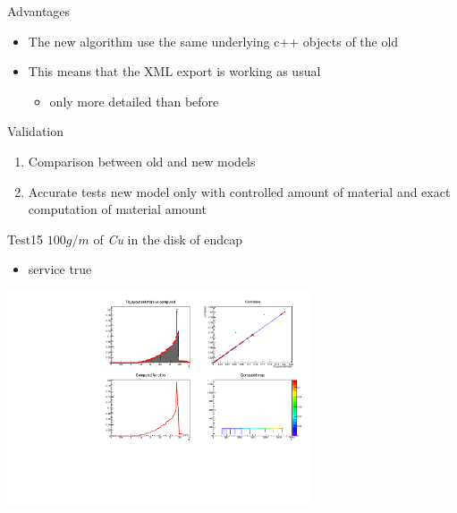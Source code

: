 \documentclass[pdftex, 11pt]{beamer}
\begin{document}
\begin{frame}{Advantages}
  \begin{itemize}
  \item The new algorithm use the \alert{same} underlying c++ objects of the old
  \item This means that the \alert{XML} export is working as usual
    \begin{itemize}
    \item only more \alert{detailed} than before
    \end{itemize}
  \end{itemize}
\end{frame}

\begin{frame}{Validation}
  \begin{enumerate}
  \item \alert{Comparison} between old and new models
  \item Accurate \alert{tests} new model only with controlled amount of material and exact computation of material amount
  \end{enumerate}
\end{frame}

\begin{frame}
  \begin{block}{Test15}
    \alert{$100 g/m$} of \emph{Cu} in the disk of endcap
    \begin{itemize}
    \item \alert{service} true
    \end{itemize}
  \end{block}
  \begin{center}
    \includegraphics[width=9cm]{img/test15.pdf}
  \end{center}
\end{frame}
\end{document}
